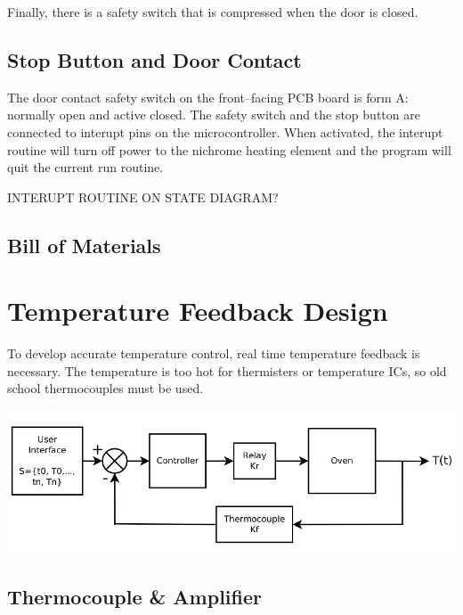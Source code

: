 \documentclass[10pt, twocolumn]{article}
\begin{document}
Finally, there is a safety switch that is compressed when the door is closed.

\subsection{Stop Button and Door Contact}

The door contact safety switch on the front--facing PCB board is form A: normally open and active closed.
The safety switch and the stop button are connected to interupt pins on the microcontroller.
When activated, the interupt routine will turn off power to the nichrome heating element
and the program will quit the current run routine.

INTERUPT ROUTINE ON STATE DIAGRAM?

\subsection{Bill of Materials}

\section{Temperature Feedback Design}

To develop accurate temperature control, real time temperature feedback
is necessary. The temperature is too hot for thermisters or temperature ICs,
so old school thermocouples must be used.

\begin{center}
	\includegraphics[width=\columnwidth]{Figures/control-system.pdf}
\end{center}

\subsection{Thermocouple \& Amplifier}
\end{document}
